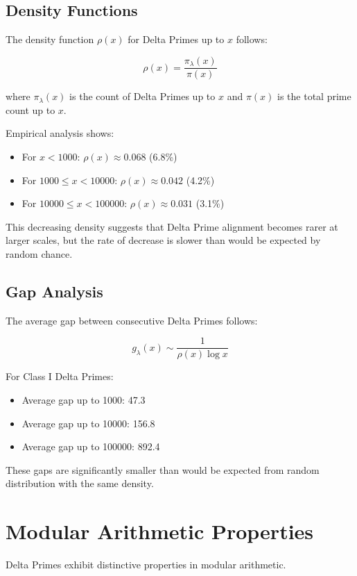 \documentclass[12pt,a4paper]{report}
\newcommand{\lambdaval}{\lambda}
\begin{document}
\begin{itemize}
\subsection{Density Functions}

The density function $\rho(x)$ for Delta Primes up to $x$ follows:

\[
\rho(x) = \frac{\pi_{\lambdaval}(x)}{\pi(x)}
\]

where $\pi_{\lambdaval}(x)$ is the count of Delta Primes up to $x$ and $\pi(x)$ is the total prime count up to $x$.

Empirical analysis shows:
\begin{itemize}
\item For $x < 1000$: $\rho(x) \approx 0.068$ (6.8\%)
\item For $1000 \leq x < 10000$: $\rho(x) \approx 0.042$ (4.2\%)
\item For $10000 \leq x < 100000$: $\rho(x) \approx 0.031$ (3.1\%)
\end{itemize}

This decreasing density suggests that Delta Prime alignment becomes rarer at larger scales, but the rate of decrease is slower than would be expected by random chance.

\subsection{Gap Analysis}

The average gap between consecutive Delta Primes follows:

\[
g_{\lambdaval}(x) \sim \frac{1}{\rho(x) \log x}
\]

For Class I Delta Primes:
\begin{itemize}
\item Average gap up to 1000: 47.3
\item Average gap up to 10000: 156.8
\item Average gap up to 100000: 892.4
\end{itemize}

These gaps are significantly smaller than would be expected from random distribution with the same density.

\section{Modular Arithmetic Properties}

Delta Primes exhibit distinctive properties in modular arithmetic.


\end{itemize}
\end{document}
